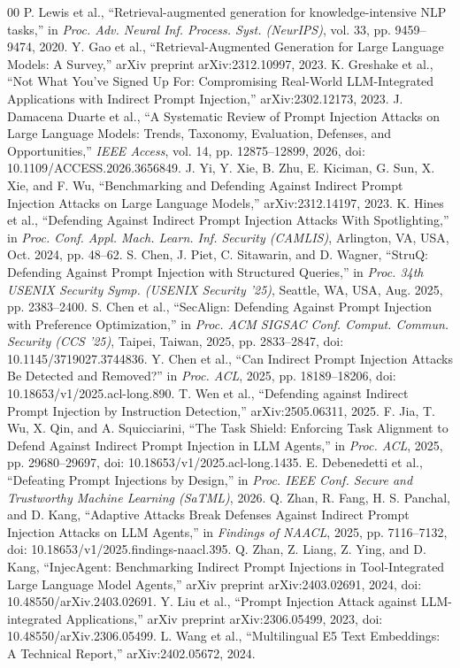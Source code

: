\documentclass[conference,a4paper]{IEEEtran}
\begin{document}
\begin{thebibliography}{00}
 P. Lewis et al., ``Retrieval-augmented generation for knowledge-intensive NLP tasks,'' in \emph{Proc. Adv. Neural Inf. Process. Syst. (NeurIPS)}, vol. 33, pp. 9459--9474, 2020.
 Y. Gao et al., ``Retrieval-Augmented Generation for Large Language Models: A Survey,'' arXiv preprint arXiv:2312.10997, 2023.
 K. Greshake et al., ``Not What You've Signed Up For: Compromising Real-World LLM-Integrated Applications with Indirect Prompt Injection,'' arXiv:2302.12173, 2023.
 J. Damacena Duarte et al., ``A Systematic Review of Prompt Injection Attacks on Large Language Models: Trends, Taxonomy, Evaluation, Defenses, and Opportunities,'' \emph{IEEE Access}, vol. 14, pp. 12875--12899, 2026, doi: 10.1109/ACCESS.2026.3656849.
 J. Yi, Y. Xie, B. Zhu, E. Kiciman, G. Sun, X. Xie, and F. Wu, ``Benchmarking and Defending Against Indirect Prompt Injection Attacks on Large Language Models,'' arXiv:2312.14197, 2023.
 K. Hines et al., ``Defending Against Indirect Prompt Injection Attacks With Spotlighting,'' in \emph{Proc. Conf. Appl. Mach. Learn. Inf. Security (CAMLIS)}, Arlington, VA, USA, Oct. 2024, pp. 48--62.
 S. Chen, J. Piet, C. Sitawarin, and D. Wagner, ``StruQ: Defending Against Prompt Injection with Structured Queries,'' in \emph{Proc. 34th USENIX Security Symp. (USENIX Security '25)}, Seattle, WA, USA, Aug. 2025, pp. 2383--2400.
 S. Chen et al., ``SecAlign: Defending Against Prompt Injection with Preference Optimization,'' in \emph{Proc. ACM SIGSAC Conf. Comput. Commun. Security (CCS '25)}, Taipei, Taiwan, 2025, pp. 2833--2847, doi: 10.1145/3719027.3744836.
 Y. Chen et al., ``Can Indirect Prompt Injection Attacks Be Detected and Removed?'' in \emph{Proc. ACL}, 2025, pp. 18189--18206, doi: 10.18653/v1/2025.acl-long.890.
 T. Wen et al., ``Defending against Indirect Prompt Injection by Instruction Detection,'' arXiv:2505.06311, 2025.
 F. Jia, T. Wu, X. Qin, and A. Squicciarini, ``The Task Shield: Enforcing Task Alignment to Defend Against Indirect Prompt Injection in LLM Agents,'' in \emph{Proc. ACL}, 2025, pp. 29680--29697, doi: 10.18653/v1/2025.acl-long.1435.
 E. Debenedetti et al., ``Defeating Prompt Injections by Design,'' in \emph{Proc. IEEE Conf. Secure and Trustworthy Machine Learning (SaTML)}, 2026.
 Q. Zhan, R. Fang, H. S. Panchal, and D. Kang, ``Adaptive Attacks Break Defenses Against Indirect Prompt Injection Attacks on LLM Agents,'' in \emph{Findings of NAACL}, 2025, pp. 7116--7132, doi: 10.18653/v1/2025.findings-naacl.395.
 Q. Zhan, Z. Liang, Z. Ying, and D. Kang, ``InjecAgent: Benchmarking Indirect Prompt Injections in Tool-Integrated Large Language Model Agents,'' arXiv preprint arXiv:2403.02691, 2024, doi: 10.48550/arXiv.2403.02691.
 Y. Liu et al., ``Prompt Injection Attack against LLM-integrated Applications,'' arXiv preprint arXiv:2306.05499, 2023, doi: 10.48550/arXiv.2306.05499.
 L. Wang et al., ``Multilingual E5 Text Embeddings: A Technical Report,'' arXiv:2402.05672, 2024.
\end{thebibliography}
\end{document}
